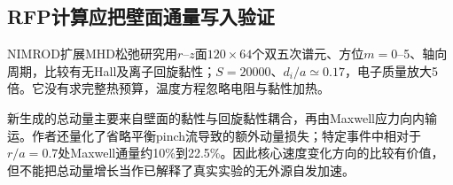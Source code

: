 \subsection{RFP计算应把壁面通量写入验证}
NIMROD扩展MHD松弛研究\citep{F798}用$r$--$z$面$120\times64$个双五次谱元、方位$m=0$--5、轴向周期，比较有无Hall及离子回旋黏性；$S=20000$、$d_i/a\simeq0.17$，电子质量放大5倍。它没有求完整热预算，温度方程忽略电阻与黏性加热。

新生成的总动量主要来自壁面的黏性与回旋黏性耦合，再由Maxwell应力向内输运。作者还量化了省略平衡pinch流导致的额外动量损失；特定事件中相对于$r/a=0.7$处Maxwell通量约10\%到22.5\%。因此核心速度变化方向的比较有价值，但不能把总动量增长当作已解释了真实实验的无外源自发加速。
